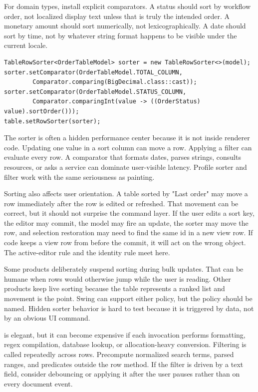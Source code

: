 For domain types, install explicit comparators. A status should sort by workflow order, not localized display text unless that is truly the intended order. A monetary amount should sort numerically, not lexicographically. A date should sort by time, not by whatever string format happens to be visible under the current locale.

\begin{lstlisting}[caption={Installing domain-specific comparators.}]
TableRowSorter<OrderTableModel> sorter = new TableRowSorter<>(model);
sorter.setComparator(OrderTableModel.TOTAL_COLUMN,
        Comparator.comparing(BigDecimal.class::cast));
sorter.setComparator(OrderTableModel.STATUS_COLUMN,
        Comparator.comparingInt(value -> ((OrderStatus) value).sortOrder()));
table.setRowSorter(sorter);
\end{lstlisting}

The sorter is often a hidden performance center because it is not inside renderer code. Updating one value in a sort column can move a row. Applying a filter can evaluate every row. A comparator that formats dates, parses strings, consults resources, or asks a service can dominate user-visible latency. Profile sorter and filter work with the same seriousness as painting.

Sorting also affects user orientation. A table sorted by "Last order" may move a row immediately after the row is edited or refreshed. That movement can be correct, but it should not surprise the command layer. If the user edits a sort key, the editor may commit, the model may fire an update, the sorter may move the row, and selection restoration may need to find the same id in a new view row. If code keeps a view row from before the commit, it will act on the wrong object. The active-editor rule and the identity rule meet here.

Some products deliberately suspend sorting during bulk updates. That can be humane when rows would otherwise jump while the user is reading. Other products keep live sorting because the table represents a ranked list and movement is the point. Swing can support either policy, but the policy should be named. Hidden sorter behavior is hard to test because it is triggered by data, not by an obvious UI command.

 is elegant, but it can become expensive if each invocation performs formatting, regex compilation, database lookup, or allocation-heavy conversion. Filtering is called repeatedly across rows. Precompute normalized search terms, parsed ranges, and predicates outside the row method. If the filter is driven by a text field, consider debouncing or applying it after the user pauses rather than on every document event.

